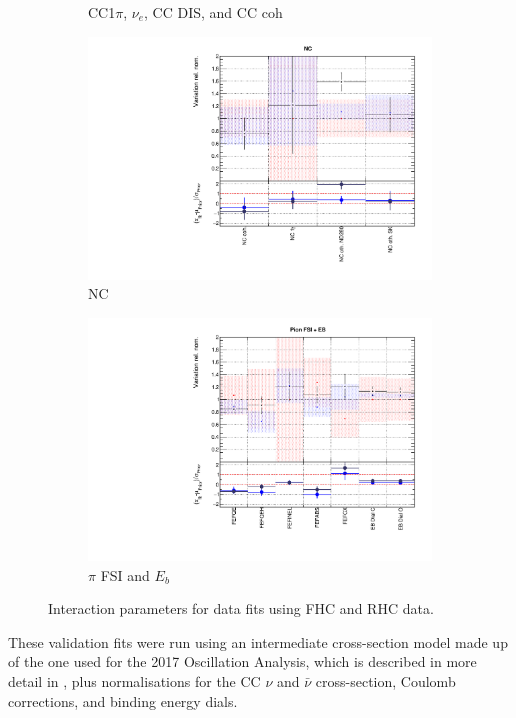 \begin{figure}[t]
\begin{subfigure}{0.49\textwidth}
  \caption{CC1$\pi$, $\nu_e$, CC DIS, and CC coh}
  \label{fig:}
\end{subfigure}
\begin{subfigure}{0.49\textwidth}
  \centering
  \includegraphics[width=0.95\linewidth]{figs/rhcmpdatxsec28_3}
  \caption{NC}
  \label{fig:}
\end{subfigure}
\begin{subfigure}{0.49\textwidth}
  \centering
  \includegraphics[width=0.95\linewidth]{figs/rhcmpdatxsec28_4}
  \caption{$\pi$ FSI and $E_b$}
  \label{fig:}
\end{subfigure}
\caption{Interaction parameters for data fits using FHC and RHC data.}
\label{fig:rhcmpidat28xsec}
\end{figure}

These validation fits were run using an intermediate cross-section model made up of the one used for the 2017 Oscillation Analysis, which is described in more detail in \cite{tn315}, plus normalisations for the CC $\nu$ and $\bar{\nu}$ cross-section, Coulomb corrections, and binding energy dials. 

\newpage